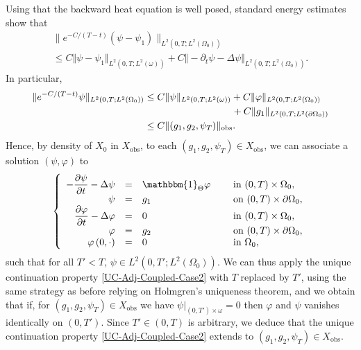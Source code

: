 \documentclass[JEP,XML,SOM,Unicode,NoFloatCountersInSection]{cedram}
\newcommand{\obs}{\mathrm{obs}}
\newcommand{\norm}[1]{\Vert#1\Vert}
\theoremstyle{definition}
\begin{document}
Using that the backward heat equation is well posed, standard energy estimates show that
\begin{multline*}
\| e^{-C/(T-t)} (\psi - \psi_1) \|_{L^2(0,T; L^2(\Omega_0))}\\
\leq
C \norm{\psi- \psi_1}_{L^2(0,T; L^2(\omega))}
+
{C\norm{ - \partial_t \psi - \Delta \psi }_{L^2(0,T; L^2(\Omega_0))}}.
\end{multline*}
In particular,
\begin{align*}
\| e^{-C/(T-t)} \psi \|_{L^2(0,T; L^2(\Omega_0))}
& \leq
C \norm{\psi}_{L^2(0,T; L^2(\omega))}
+
{C\norm{ \varphi }_{L^2(0,T; L^2(\Omega_0))}}\\
&\hspace*{3.17cm}+
C \norm{g_1}_{L^2(0,T; L^2(\partial \Omega_0))}
\\
&\leq
C \norm{(g_1, g_2, \psi_T)}_{\obs}.
\end{align*}
Hence, by density of $X_0$ in $X_{\obs}$, to each $(g_1, g_2, \psi_T) \in X_{\obs}$, we can associate a solution $(\psi, \varphi)$ to
\begin{equation*}
\left\{
\begin{array}{rcll}
- \dfrac{\partial \psi}{\partial t}-\Delta \psi &=&\mathbbm{1}_{\Theta}\varphi \quad&\text{ in }(0,T) \times \Omega_0,
\\
\psi &=& g_1 &\text{ on }(0,T) \times \partial \Omega_0,
\\
\dfrac{\partial \varphi}{\partial t}-\Delta \varphi &=& 0 &\text{ in }(0,T) \times \Omega_0,
\\
\varphi &=& g_2 &\text{ on }(0,T) \times \partial \Omega_0,
\\
\varphi\left(0,\cdot\right) &=&0 &\text{ in }\Omega_0,
\end{array}
\right.
\end{equation*}
such that for all $T' < T$, $\psi \in L^2(0,T'; L^2(\Omega_0))$. We can thus apply the unique con\-ti\-nuation property \eqref{UC-Adj-Coupled-Case2} with $T$ replaced by $T'$, using the same strategy as before relying on Holmgren's uniqueness theorem, and we obtain that if, for $(g_1, g_2, \psi_T) \in X_{\obs}$ we have $\psi|_{(0,T') \times \omega} = 0$ then $\varphi$ and $\psi$ vanishes identically on $(0,T')$. Since $T' \in (0,T)$ is arbitrary, we deduce that the unique continuation property \eqref{UC-Adj-Coupled-Case2} extends to $(g_1, g_2, \psi_T) \in X_{\obs}$.
\end{document}
